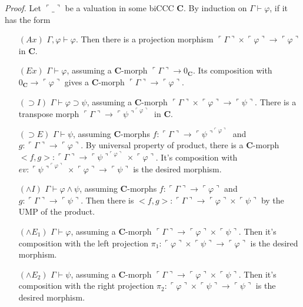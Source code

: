 \documentclass[a4paper,12pt]{paper}
\newcommand{\val}[1]{\ulcorner #1 \urcorner}
\begin{document}
\emph{Proof.} Let $\val \_ $ be a valuation in some biCCC $\mathbf{C}$. By induction on $\Gamma \vdash \varphi$, if it has the form
\begin{itemize}
\item[$(Ax)$] $\Gamma, \varphi \vdash \varphi$. Then there is a projection morphism $\val \Gamma  \times  \val \varphi  \longrightarrow  \val \varphi $ in $\mathbf{C}$.\\
\item[$(Ex)$] $\Gamma \vdash \varphi$, assuming a $\mathbf{C}$-morph $\val \Gamma  \longrightarrow 0_\mathbf{C}$. Its composition with $0_\mathbf{C} \longrightarrow  \val \varphi $ gives a $\mathbf{C}$-morph $\val \Gamma  \longrightarrow \val \varphi $.\\
\item[$(\supset I)$] $\Gamma \vdash \varphi \supset \psi$, assuming a $\mathbf{C}$-morph $\val \Gamma  \times \val \varphi  \longrightarrow \val \psi$. There is a transpose morph $\val \Gamma \longrightarrow \val \psi^{\val \varphi}$ in $\mathbf{C}$.\\
\item[$(\supset E)$] $\Gamma \vdash \psi$, assuming $\mathbf{C}$-morphs $f : \val \Gamma \longrightarrow \val \psi^{\val \varphi}$ and $g : \val \Gamma \longrightarrow \val \varphi$. By universal property of product, there is a $\mathbf{C}$-morph $<f,g> :‌\val \Gamma \longrightarrow \val \psi^{\val \varphi} \times \val \varphi$. It's composition with $ev :‌\val \psi^{\val \varphi} \times \val \varphi \longrightarrow \val \psi$ is the desired morphism.\\
\item[$(\land I)$] $\Gamma \vdash \varphi \land \psi$, assuming $\mathbf{C}$-morphs $f : \val \Gamma \longrightarrow \val \varphi$ and $g :‌\val \Gamma \longrightarrow \val \psi$. Then there is $<f,g> :‌\val \Gamma \longrightarrow \val \varphi \times \val \psi$ by the UMP of the product.\\
\item[$(\land E_1)$] $\Gamma \vdash \varphi$, assuming a $\mathbf{C}$-morph $\val \Gamma \longrightarrow \val \varphi \times \val \psi$. Then it's composition with the left projection $\pi_1 : \val \varphi \times \val \psi \longrightarrow \val \varphi$ is the desired morphism.\\
\item[$(\land E_2)$] $\Gamma \vdash \psi$, assuming a $\mathbf{C}$-morph $\val \Gamma \longrightarrow \val \varphi \times \val \psi$. Then it's composition with the right projection $\pi_2 : \val \varphi \times \val \psi \longrightarrow \val \psi$ is the desired morphism.\\

\end{itemize}
\end{document}
